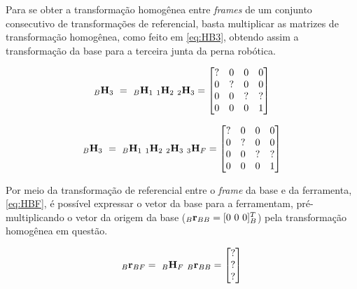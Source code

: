 Para se obter a transformação homogênea entre \textit{frames} de um conjunto consecutivo de transformações de referencial, basta multiplicar as matrizes de transformação homogênea, como feito em \eqref{eq:HB3}, obtendo assim a transformação da base para a terceira junta da perna robótica.

\begin{equation}\label{eq:HB3}
	_B \mathbf{H}_3 \ = \ _B \mathbf{H}_1 \  _1 \mathbf{H}_2  \ _2 \mathbf{H}_3 = \begin{bmatrix}
		? & 0  & 0      &  0 \\
		0 & ?  & 0      &  0 \\
		0 & 0  & ?      &  ? \\
		0 & 0  & 0      &  1
	\end{bmatrix}
\end{equation}

\begin{equation}\label{eq:HBF}
	_B \mathbf{H}_3 \ = \ _B \mathbf{H}_1 \  _1 \mathbf{H}_2  \ _2 \mathbf{H}_3  \ _3 \mathbf{H}_F = \begin{bmatrix}
		? & 0  & 0      &  0 \\
		0 & ?  & 0      &  0 \\
		0 & 0  & ?      &  ? \\
		0 & 0  & 0      &  1
	\end{bmatrix}
\end{equation}

Por meio da transformação de referencial entre o \textit{frame} da base e da ferramenta, \eqref{eq:HBF}, é possível expressar o vetor da base para a ferramentam, pré-multiplicando o vetor da origem da base ($_B\mathbf{r}_{BB} = [0 \ 0 \ 0]^T_B$) pela transformação homogênea em questão.

\begin{equation}\label{eq:r_BF_inB}
	_B \mathbf{r}_{BF} = \ _B\mathbf{H}_F \ _B\mathbf{r}_{BB} = \begin{bmatrix} ? \\ ?  \\ ? \end{bmatrix}
\end{equation}





\section{}

